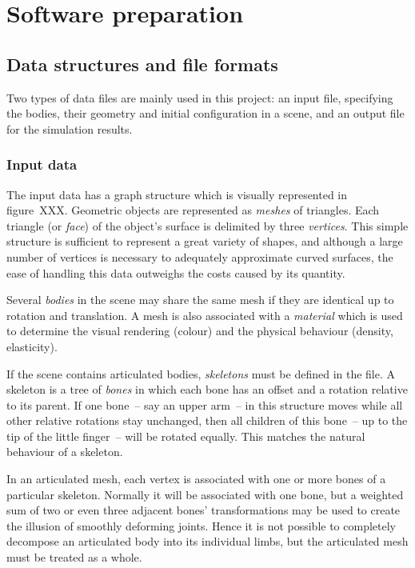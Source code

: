 \section{Software preparation\label{softwarePreparation}}

\subsection{Data structures and file formats}
Two types of data files are mainly used in this project: an input file, specifying the bodies,
their geometry and initial configuration in a scene, and an output file for the simulation
results.

\subsubsection{Input data}
The input data has a graph structure which is visually represented in figure~XXX.
Geometric objects are represented as \emph{meshes} of triangles. Each triangle (or \emph{face})
of the object's surface is delimited by three \emph{vertices}. This simple structure is sufficient
to represent a great variety of shapes, and although a large number of vertices is necessary to
adequately approximate curved surfaces, the ease of handling this data outweighs the costs caused
by its quantity.

Several \emph{bodies} in the scene may share the same mesh if they are identical up to rotation
and translation. A mesh is also associated with a \emph{material} which is used to determine the
visual rendering (colour) and the physical behaviour (density, elasticity).

If the scene contains articulated bodies, \emph{skeletons} must be defined in the file. A skeleton
is a tree of \emph{bones} in which each bone has an offset and a rotation relative to its parent.
If one bone~-- say an upper arm~-- in this structure moves while all other relative rotations stay
unchanged, then all children of this bone~-- up to the tip of the little finger~-- will be rotated
equally. This matches the natural behaviour of a skeleton.

In an articulated mesh, each vertex is associated with one or more bones of a particular skeleton.
Normally it will be associated with one bone, but a weighted sum of two or even three adjacent
bones' transformations may be used to create the illusion of smoothly deforming joints. Hence it
is not possible to completely decompose an articulated body into its individual limbs, but the
articulated mesh must be treated as a whole.

